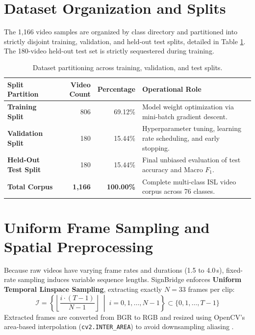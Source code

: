 \section{Dataset Organization and Splits}
\label{sec:dataset_splits}
The 1,166 video samples are organized by class directory and partitioned into strictly disjoint training, validation, and held-out test splits, detailed in Table \ref{tab:dataset_splits}. The 180-video held-out test set is strictly sequestered during training.

\begin{table}[htbp]
\centering
\caption{Dataset partitioning across training, validation, and test splits.}
\label{tab:dataset_splits}
\scriptsize
\begin{tabularx}{\textwidth}{l r r X}
\toprule
\textbf{Split Partition} & \textbf{Video Count} & \textbf{Percentage} & \textbf{Operational Role} \\
\midrule
\textbf{Training Split} & 806 & 69.12\% & Model weight optimization via mini-batch gradient descent. \\
\textbf{Validation Split} & 180 & 15.44\% & Hyperparameter tuning, learning rate scheduling, and early stopping. \\
\textbf{Held-Out Test Split} & 180 & 15.44\% & Final unbiased evaluation of test accuracy and Macro $F_1$. \\
\midrule
\textbf{Total Corpus} & \textbf{1,166} & \textbf{100.00\%} & Complete multi-class ISL video corpus across 76 classes. \\
\bottomrule
\end{tabularx}
\end{table}

\section{Uniform Frame Sampling and Spatial Preprocessing}
\label{sec:frame_sampling}
Because raw videos have varying frame rates and durations (1.5 to 4.0\,s), fixed-rate sampling induces variable sequence lengths. SignBridge enforces \textbf{Uniform Temporal Linspace Sampling}, extracting exactly $N = 33$ frames per clip:
\begin{equation}
    \mathcal{I} = \left\{ \left\lfloor \frac{i \cdot (T - 1)}{N - 1} \right\rfloor \;\middle|\; i = 0, 1, \dots, N - 1 \right\} \subset \{0, 1, \dots, T - 1\}
    \label{eq:linspace_sampling}
\end{equation}
Extracted frames are converted from BGR to RGB and resized using OpenCV's area-based interpolation (\texttt{cv2.INTER\_AREA}) to avoid downsampling aliasing \cite{bradski2000opencv}.

